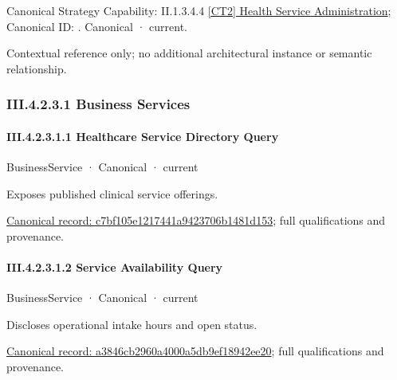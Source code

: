 {\small Canonical Strategy Capability: II.1.3.4.4 \hyperref[element:ba68a52913a0499d8377553bddfa74a4]{[CT2] Health Service Administration}; Canonical ID: \texttt{}. Canonical · current.}\par
Contextual reference only; no additional architectural instance or semantic relationship.\par
\subsubsection*{III.4.2.3.1 Business Services}
\label{navigation:III.4.2.3.1}

\paragraph*{III.4.2.3.1.1 Healthcare Service Directory Query}
\label{navigation:III.4.2.3.1.1}

\label{element:c7bf105e1217441a9423706b1481d153}
{\small BusinessService · Canonical · current}\par

Exposes published clinical service offerings.


{\footnotesize \href{../../../../../../../continuum/business/business-service/c7bf105e1217441a9423706b1481d153.md}{Canonical record: c7bf105e1217441a9423706b1481d153}; full qualifications and provenance.}\par
\paragraph*{III.4.2.3.1.2 Service Availability Query}
\label{navigation:III.4.2.3.1.2}

\label{element:a3846cb2960a4000a5db9ef18942ee20}
{\small BusinessService · Canonical · current}\par

Discloses operational intake hours and open status.


{\footnotesize \href{../../../../../../../continuum/business/business-service/a3846cb2960a4000a5db9ef18942ee20.md}{Canonical record: a3846cb2960a4000a5db9ef18942ee20}; full qualifications and provenance.}\par
